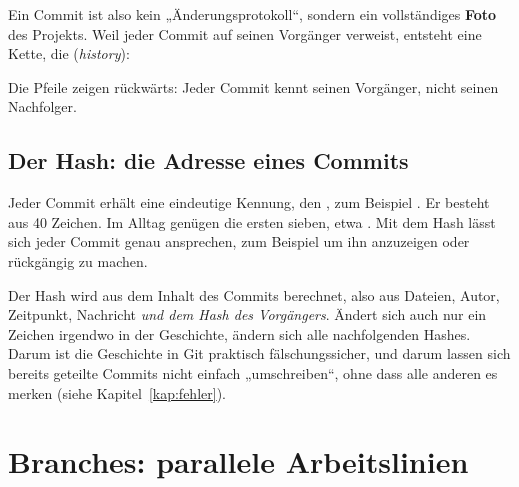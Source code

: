 Ein Commit ist also kein „Änderungsprotokoll“, sondern ein vollständiges \textbf{Foto} des
Projekts. Weil jeder Commit auf seinen Vorgänger verweist, entsteht eine Kette, die
 (\emph{history}):

\begin{center}
\end{center}

Die Pfeile zeigen rückwärts: Jeder Commit kennt seinen Vorgänger, nicht seinen Nachfolger.

\subsection*{Der Hash: die Adresse eines Commits}

Jeder Commit erhält eine eindeutige Kennung, den , zum Beispiel
. Er besteht aus 40 Zeichen. Im Alltag genügen die ersten sieben, etwa
. Mit dem Hash lässt sich jeder Commit genau ansprechen, zum Beispiel um ihn
anzuzeigen oder rückgängig zu machen.

\begin{hintergrund}
Der Hash wird aus dem Inhalt des Commits berechnet, also aus Dateien, Autor, Zeitpunkt,
Nachricht \emph{und dem Hash des Vorgängers}. Ändert sich auch nur ein Zeichen irgendwo in
der Geschichte, ändern sich alle nachfolgenden Hashes. Darum ist die Geschichte in Git
praktisch fälschungssicher, und darum lassen sich bereits geteilte Commits nicht einfach
„umschreiben“, ohne dass alle anderen es merken (siehe Kapitel~\ref{kap:fehler}).
\end{hintergrund}

\section{Branches: parallele Arbeitslinien}

